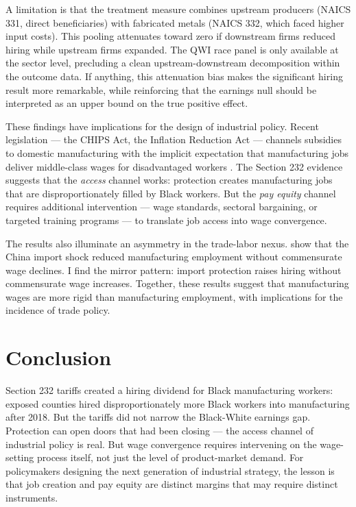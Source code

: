 \documentclass[12pt]{article}
\begin{document}
A limitation is that the treatment measure combines upstream producers (NAICS 331, direct beneficiaries) with fabricated metals (NAICS 332, which faced higher input costs). This pooling attenuates toward zero if downstream firms reduced hiring while upstream firms expanded. The QWI race panel is only available at the sector level, precluding a clean upstream-downstream decomposition within the outcome data. If anything, this attenuation bias makes the significant hiring result more remarkable, while reinforcing that the earnings null should be interpreted as an upper bound on the true positive effect.

These findings have implications for the design of industrial policy. Recent legislation --- the CHIPS Act, the Inflation Reduction Act --- channels subsidies to domestic manufacturing with the implicit expectation that manufacturing jobs deliver middle-class wages for disadvantaged workers \citep{autor2021work}. The Section 232 evidence suggests that the \textit{access} channel works: protection creates manufacturing jobs that are disproportionately filled by Black workers. But the \textit{pay equity} channel requires additional intervention --- wage standards, sectoral bargaining, or targeted training programs --- to translate job access into wage convergence.

The results also illuminate an asymmetry in the trade-labor nexus. \citet{autor2013china} show that the China import shock reduced manufacturing employment without commensurate wage declines. I find the mirror pattern: import protection raises hiring without commensurate wage increases. Together, these results suggest that manufacturing wages are more rigid than manufacturing employment, with implications for the incidence of trade policy.


\section{Conclusion}

Section 232 tariffs created a hiring dividend for Black manufacturing workers: exposed counties hired disproportionately more Black workers into manufacturing after 2018. But the tariffs did not narrow the Black-White earnings gap. Protection can open doors that had been closing --- the access channel of industrial policy is real. But wage convergence requires intervening on the wage-setting process itself, not just the level of product-market demand. For policymakers designing the next generation of industrial strategy, the lesson is that job creation and pay equity are distinct margins that may require distinct instruments.
\end{document}
